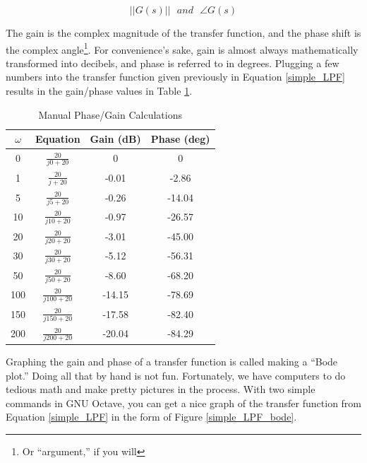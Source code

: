 \begin{equation}
\big| \big| G(s) \big| \big| ~~~ and ~~~ \angle G(s) 
\end{equation}

The gain is the complex magnitude of the transfer function, and the phase shift is the complex angle\footnote{Or ``argument,'' if you will}. For convenience's sake, gain is almost always mathematically transformed into decibels, and phase is referred to in degrees. Plugging a few numbers into the transfer function given previously in Equation \ref{simple_LPF} results in the gain/phase values in Table \ref{manual_bode}.

\begin{table}[h]
\centering
\begin{tabular}{c|c|cc}
$\omega$ & Equation & Gain (dB) & Phase (deg) \\
\hline
0 & $\frac{20}{j0 + 20}$ & 0 & 0 \\
1 & $\frac{20}{j + 20}$ & -0.01 & -2.86 \\
5 & $\frac{20}{j5 + 20}$ & -0.26 & -14.04 \\
10 & $\frac{20}{j10 + 20}$ & -0.97 & -26.57 \\
20 & $\frac{20}{j20 + 20}$ & -3.01 & -45.00 \\
30 & $ \frac{20}{j30 + 20}$ & -5.12 & -56.31 \\
50 & $\frac{20}{j50 + 20}$ & -8.60 & -68.20 \\
100 & $\frac{20}{j100 + 20}$ & -14.15 & -78.69 \\
150 & $\frac{20}{j150 + 20}$ & -17.58 & -82.40 \\
200 & $\frac{20}{j200 + 20}$ & -20.04 & -84.29 \\
\end{tabular}
\caption{Manual Phase/Gain Calculations}\label{manual_bode}
\end{table}

Graphing the gain and phase of a transfer function is called making a ``Bode plot.'' Doing all that by hand is not fun. Fortunately, we have computers to do tedious math and make pretty pictures in the process. With two simple commands in GNU Octave, you can get a nice graph of the transfer function from Equation \ref{simple_LPF} in the form of Figure \ref{simple_LPF_bode}.

